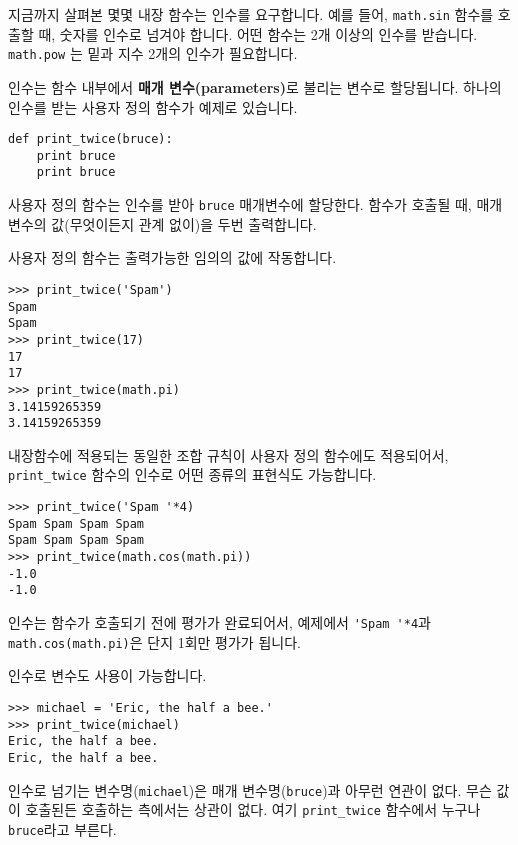 지금까지 살펴본 몇몇 내장 함수는 인수를 요구합니다. 예를 들어, {\tt math.sin} 함수를 호출할 때, 숫자를 인수로 넘겨야 합니다.
어떤 함수는 2개 이상의 인수를 받습니다. {\tt math.pow} 는 밑과 지수 2개의 인수가 필요합니다. 

인수는 함수 내부에서  {\bf 매개 변수(parameters)}로 불리는 변수로 할당됩니다.
하나의 인수를 받는 사용자 정의 함수가 예제로 있습니다.  


\beforeverb
\begin{verbatim}
def print_twice(bruce):
    print bruce
    print bruce
\end{verbatim}
\afterverb
%

사용자 정의 함수는 인수를 받아 {\tt bruce} 매개변수에 할당한다. 함수가 호출될 때, 매개변수의 값(무엇이든지 관계 없이)을 두번 출력합니다.

사용자 정의 함수는 출력가능한 임의의 값에 작동합니다.

\beforeverb
\begin{verbatim}
>>> print_twice('Spam')
Spam
Spam
>>> print_twice(17)
17
17
>>> print_twice(math.pi)
3.14159265359
3.14159265359
\end{verbatim}
\afterverb
%

내장함수에 적용되는 동일한 조합 규칙이 사용자 정의 함수에도 적용되어서, \verb"print_twice" 함수의 인수로 어떤 종류의 표현식도 가능합니다. 


\beforeverb
\begin{verbatim}
>>> print_twice('Spam '*4)
Spam Spam Spam Spam
Spam Spam Spam Spam
>>> print_twice(math.cos(math.pi))
-1.0
-1.0
\end{verbatim}
\afterverb
%

인수는 함수가 호출되기 전에 평가가 완료되어서, 예제에서 \verb"'Spam '*4"과 {\tt math.cos(math.pi)}은 단지 1회만 평가가 됩니다.


인수로 변수도 사용이 가능합니다.

\beforeverb
\begin{verbatim}
>>> michael = 'Eric, the half a bee.'
>>> print_twice(michael)
Eric, the half a bee.
Eric, the half a bee.
\end{verbatim}
\afterverb
%

인수로 넘기는 변수명({\tt michael})은 매개 변수명({\tt bruce})과 아무런 연관이 없다.
무슨 값이 호출된든 호출하는 측에서는 상관이 없다. 여기 \verb"print_twice" 함수에서 누구나 {\tt bruce}라고 부른다. 

